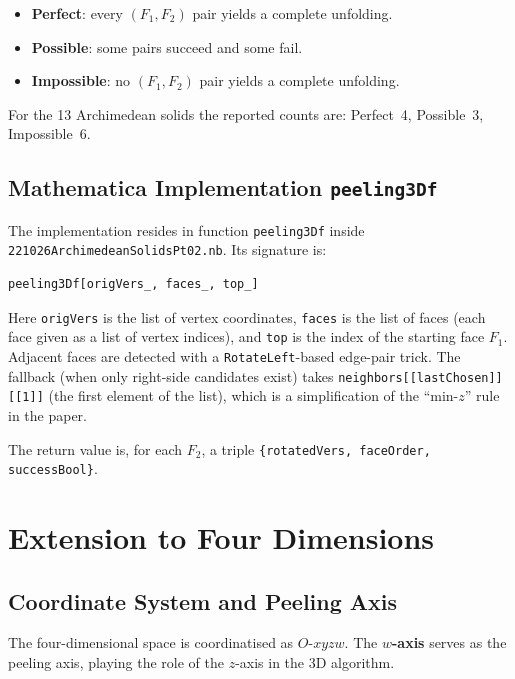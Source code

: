 \documentclass[12pt,a4paper]{article}
\theoremstyle{definition}
\begin{document}
\begin{itemize}
  \item \textbf{Perfect}: every $(F_1, F_2)$ pair yields a complete unfolding.
  \item \textbf{Possible}: some pairs succeed and some fail.
  \item \textbf{Impossible}: no $(F_1, F_2)$ pair yields a complete unfolding.
\end{itemize}

\noindent
For the 13 Archimedean solids the reported counts are:
Perfect~4, Possible~3, Impossible~6.

\subsection{Mathematica Implementation \texttt{peeling3Df}}

The implementation resides in function \texttt{peeling3Df} inside
\texttt{221026ArchimedeanSolidsPt02.nb}.
Its signature is:

\begin{lstlisting}
peeling3Df[origVers_, faces_, top_]
\end{lstlisting}

\noindent
Here \texttt{origVers} is the list of vertex coordinates, \texttt{faces} is
the list of faces (each face given as a list of vertex indices), and
\texttt{top} is the index of the starting face $F_1$.
Adjacent faces are detected with a \texttt{RotateLeft}-based edge-pair trick.
The fallback (when only right-side candidates exist) takes
\texttt{neighbors[[lastChosen]][[1]]} (the first element of the list),
which is a simplification of the ``min-$z$'' rule in the paper.

The return value is, for each $F_2$, a triple
\texttt{\{rotatedVers, faceOrder, successBool\}}.


\section{Extension to Four Dimensions}

\subsection{Coordinate System and Peeling Axis}

The four-dimensional space is coordinatised as $O\text{-}xyzw$.
The \textbf{$w$-axis} serves as the peeling axis, playing the role of the
$z$-axis in the 3D algorithm.
\end{document}
